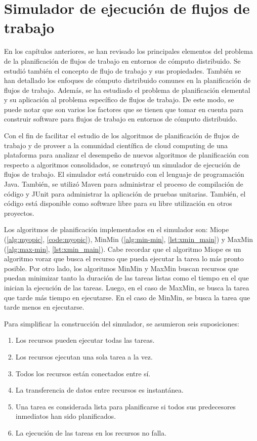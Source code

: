 \chapter[Simulador]{Simulador de ejecución de flujos de trabajo}

En los capítulos anteriores, se han revisado los principales elementos del problema de la planificación de flujos de trabajo en entornos de cómputo distribuido. Se estudió también el concepto de flujo de trabajo y sus propiedades. También se han detallado los enfoques de cómputo distribuido comunes en la planificación de flujos de trabajo. Además, se ha estudiado el problema de planificación elemental y su aplicación al problema específico de flujos de trabajo. De este modo, se puede notar que son varios los factores que se tienen que tomar en cuenta para construir software para flujos de trabajo en entornos de cómputo distribuido.

Con el fin de facilitar el estudio de los algoritmos de planificación de flujos de trabajo y de proveer a la comunidad científica de cloud computing de una plataforma para analizar el desempeño de nuevos algoritmos de planificación con respecto a algoritmos consolidados, se construyó un simulador de ejecución de flujos de trabajo. El simulador está construido con el lenguaje de programación Java. También, se utilizó Maven \cite{maven2014} para administrar el proceso de compilación de código y JUnit \cite{junit2014} para administrar la aplicación de pruebas unitarias. También, el código está disponible como software libre \cite{dominofire2014workflowsimulator} para su libre utilización en otros proyectos.

Los algoritmos de planificación implementados en el simulador son: Miope (\ref{alg:myopic}, \ref{code:myopic}), MinMin (\ref{alg:min-min}, \ref{lst:xmin_main}) y MaxMin (\ref{alg:max-min}, \ref{lst:xmin_main}). Cabe recordar que el algoritmo Miope es un algoritmo voraz que busca el recurso que pueda ejecutar la tarea lo más pronto posible. Por otro lado, los algoritmos MinMin y MaxMin buscan recursos que puedan minimizar tanto la duración de las tareas listas como el tiempo en el que inician la ejecución de las tareas. Luego, en el caso de MaxMin, se busca la tarea que tarde más tiempo en ejecutarse. En el caso de MinMin, se busca la tarea que tarde menos en ejecutarse.

Para simplificar la construcción del simulador, se asumieron seis suposiciones:

\begin{enumerate}
\item Los recursos pueden ejecutar todas las tareas.
\item Los recursos ejecutan una sola tarea a la vez.
\item Todos los recursos están conectados entre sí.
\item La transferencia de datos entre recursos es instantánea.
\item Una tarea es considerada lista para planificarse si todos sus predecesores inmediatos han sido planificados.
\item La ejecución de las tareas en los recursos no falla.
\end{enumerate}

